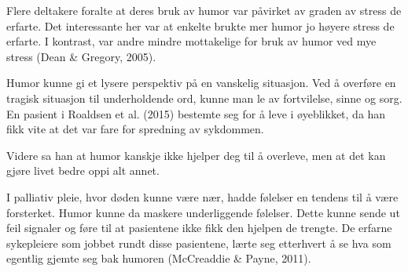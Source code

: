 Flere deltakere foralte at deres bruk av humor var påvirket av graden av stress
de erfarte. Det interessante her var at enkelte brukte mer humor jo høyere
stress de erfarte. I kontrast, var andre mindre mottakelige for bruk av humor
ved mye stress (Dean \&{} Gregory, 2005).

Humor kunne gi et lysere perspektiv på en vanskelig situasjon. Ved å overføre
en tragisk situasjon til underholdende ord, kunne man le av fortvilelse, sinne
og sorg. En pasient i Roaldsen et al. (2015) bestemte seg for å leve i
øyeblikket, da han fikk vite at det var fare for spredning av sykdommen.


Videre sa han at humor kanskje ikke hjelper deg til å overleve, men at det kan
gjøre livet bedre oppi alt annet.

I palliativ pleie, hvor døden kunne være nær, hadde følelser en tendens til å
være forsterket. Humor kunne da maskere underliggende følelser. Dette kunne
sende ut feil signaler og føre til at pasientene ikke fikk den hjelpen de
trengte. De erfarne sykepleiere som jobbet rundt disse pasientene, lærte seg
etterhvert å se hva som egentlig  gjemte seg bak humoren (McCreaddie \&{} Payne,
2011).
